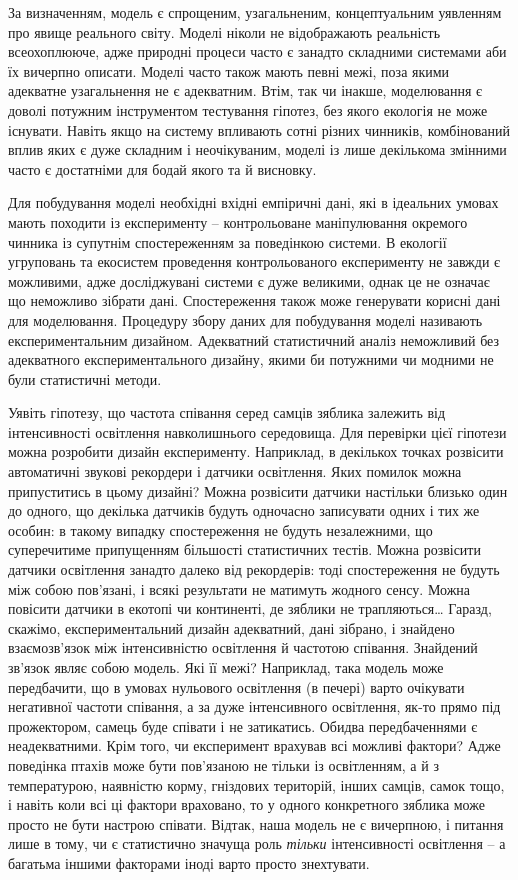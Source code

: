 \documentclass[
  11pt,
]{book}
\begin{document}
За визначенням, модель є спрощеним, узагальненим, концептуальним уявленням про явище реального світу. Моделі ніколи не відображають реальність всеохоплююче, адже природні процеси часто є занадто складними системами аби їх вичерпно описати. Моделі часто також мають певні межі, поза якими адекватне узагальнення не є адекватним. Втім, так чи інакше, моделювання є доволі потужним інструментом тестування гіпотез, без якого екологія не може існувати. Навіть якщо на систему впливають сотні різних чинників, комбінований вплив яких є дуже складним і неочікуваним, моделі із лише декількома змінними часто є достатніми для бодай якого та й висновку.

Для побудування моделі необхідні вхідні емпіричні дані, які в ідеальних умовах мають походити із експерименту -- контрольоване маніпулювання окремого чинника із супутнім спостереженням за поведінкою системи. В екології угруповань та екосистем проведення контрольованого експерименту не завжди є можливими, адже досліджувані системи є дуже великими, однак це не означає що неможливо зібрати дані. Спостереження також може генерувати корисні дані для моделювання. Процедуру збору даних для побудування моделі називають експериментальним дизайном. Адекватний статистичний аналіз неможливий без адекватного експериментального дизайну, якими би потужними чи модними не були статистичні методи.

Уявіть гіпотезу, що частота співання серед самців зяблика залежить від інтенсивності освітлення навколишнього середовища. Для перевірки цієї гіпотези можна розробити дизайн експерименту. Наприклад, в декількох точках розвісити автоматичні звукові рекордери і датчики освітлення. Яких помилок можна припуститись в цьому дизайні? Можна розвісити датчики настільки близько один до одного, що декілька датчиків будуть одночасно записувати одних і тих же особин: в такому випадку спостереження не будуть незалежними, що суперечитиме припущенням більшості статистичних тестів. Можна розвісити датчики освітлення занадто далеко від рекордерів: тоді спостереження не будуть між собою пов'язані, і всякі результати не матимуть жодного сенсу. Можна повісити датчики в екотопі чи континенті, де зяблики не трапляються\ldots{} Гаразд, скажімо, експериментальний дизайн адекватний, дані зібрано, і знайдено взаємозв'язок між інтенсивністю освітлення й частотою співання. Знайдений зв'язок являє собою модель. Які її межі? Наприклад, така модель може передбачити, що в умовах нульового освітлення (в печері) варто очікувати негативної частоти співання, а за дуже інтенсивного освітлення, як-то прямо під прожектором, самець буде співати і не затикатись. Обидва передбаченнями є неадекватними. Крім того, чи експеримент врахував всі можливі фактори? Адже поведінка птахів може бути пов'язаною не тільки із освітленням, а й з температурою, наявністю корму, гніздових територій, інших самців, самок тощо, і навіть коли всі ці фактори враховано, то у одного конкретного зяблика може просто не бути настрою співати. Відтак, наша модель не є вичерпною, і питання лише в тому, чи є статистично значуща роль \emph{тільки} інтенсивності освітлення -- а багатьма іншими факторами іноді варто просто знехтувати.
\end{document}
